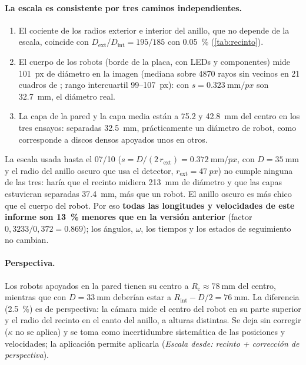 \paragraph{La escala es consistente por tres caminos independientes.}
\begin{enumerate}
  \item El cociente de los radios exterior e interior del anillo, que no depende de la escala, coincide
        con $D_{\mathrm{ext}}/D_{\mathrm{int}} = 195/185$ con \SI{0.05}{\percent} (\cref{tab:recinto}).
  \item El cuerpo de los robots (borde de la placa, con LEDs y componentes) mide \SI{101}{px} de
        diámetro en la imagen (mediana sobre \num{4870} rayos sin vecinos en 21 cuadros de ;
        rango intercuartil \num{99}--\SI{107}{px}): con $s = \SI{0.323}{\milli\metre\per px}$ son
        \SI{32.7}{\milli\metre}, el diámetro real.
  \item La capa de la pared y la capa media están a \SI{75.2}{} y \SI{42.8}{\milli\metre} del centro en los
        tres ensayos: separadas \SI{32.5}{\milli\metre}, prácticamente un diámetro de robot, como
        corresponde a discos densos apoyados unos en otros.
\end{enumerate}
La escala usada hasta el 07/10 ($s = D/(2\,r_{\mathrm{ext}}) = \SI{0.372}{\milli\metre\per px}$, con
$D = \SI{35}{\milli\metre}$ y el radio del anillo oscuro que usa el detector, $r_{\mathrm{ext}} = \SI{47}{px}$)
no cumple ninguna de las tres: haría que el recinto midiera \SI{213}{\milli\metre} de diámetro y que las
capas estuvieran separadas \SI{37.4}{\milli\metre}, más que un robot. El anillo oscuro es más chico que
el cuerpo del robot. Por eso \textbf{todas las longitudes y velocidades de este informe son
\SI{13}{\percent} menores que en la versión anterior} (factor $0{,}3233/0{,}372 = \num{0.869}$); los
ángulos, $\omega$, los tiempos y los estados de seguimiento no cambian.

\paragraph{Perspectiva.} Los robots apoyados en la pared tienen su centro a $R_{\mathrm{c}} \approx
\SI{78}{\milli\metre}$ del centro, mientras que con $D = \SI{33}{\milli\metre}$ deberían estar a
$R_{\mathrm{int}} - D/2 = \SI{76}{\milli\metre}$. La diferencia (\SI{2.5}{\percent}) es de perspectiva: la
cámara mide el centro del robot en su parte superior y el radio del recinto en el canto del anillo, a
alturas distintas. Se deja sin corregir ($\kappa$ no se aplica) y se toma como incertidumbre sistemática
de las posiciones y velocidades; la aplicación permite aplicarla (\emph{Escala desde: recinto + corrección
de perspectiva}).

